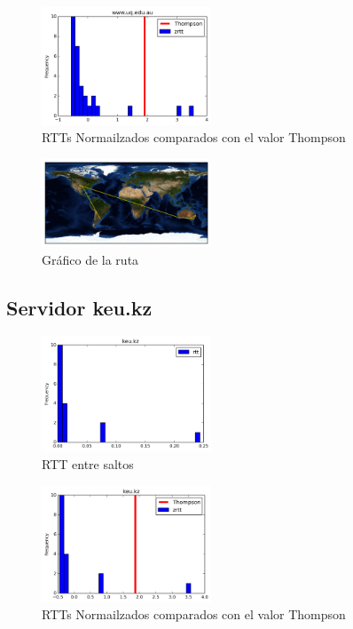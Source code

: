 \begin{figure}[H]
  \centering
    \includegraphics[width=0.45\textwidth]{histogramas_thompson/www-uq-edu-au.png}
  \caption{RTTs Normailzados comparados con el valor Thompson}
  \label{entropia-s}
\end{figure}

\begin{figure}[H]
  \centering
    \includegraphics[width=0.45\textwidth]{grafico-rutas/www-uq-edu-au.png}
  \caption{Gráfico de la ruta}
  \label{entropia-s}
\end{figure}




\subsection{Servidor keu.kz}
\begin{figure}[H]
  \centering
    \includegraphics[width=0.45\textwidth]{histogramas_rtt/keu-kz.png}
  \caption{RTT entre saltos}
  \label{entropia-s}
\end{figure}

\begin{figure}[H]
  \centering
    \includegraphics[width=0.45\textwidth]{histogramas_thompson/keu-kz.png}
  \caption{RTTs Normailzados comparados con el valor Thompson}
  \label{entropia-s}
\end{figure}

